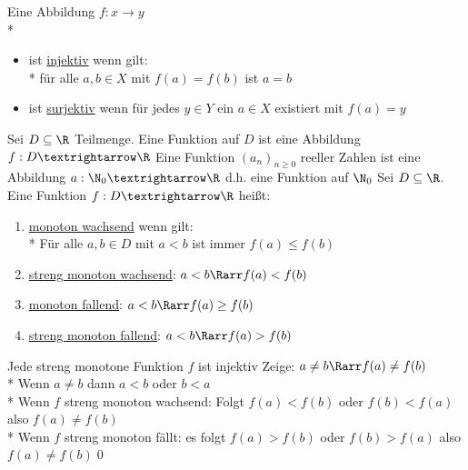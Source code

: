 %
\wdh
Eine Abbildung $f:x→y$\\*
\begin{itemize}
\item{ist \ul{injektiv} wenn gilt:\\*
für alle $a,b\in X$ mit $f(a)=f(b)$ ist $a=b$}
\item{ist \ul{surjektiv} wenn für jedes $y\in Y$ ein $a\in X$ existiert mit $f(a)=y$}
\end{itemize}
Sei $D\subseteq\R$ Teilmenge. Eine Funktion auf $D$ ist eine Abbildung $f:D→\R$
%
\bem
Eine Funktion $(a_n)_{n\geq 0}$ reeller Zahlen ist eine Abbildung $a:\N_0→\R$ d.h. eine Funktion auf $\N_0$
%
Sei $D\subseteq\R$. Eine Funktion  $f:D→\R$ heißt:
\begin{enumerate}
\item{\ul{monoton wachsend} wenn gilt:\\*
Für alle $a,b\in D$ mit $a<b$ ist immer $f(a)\leq f(b)$}
\item{\ul{streng monoton wachsend}: $a<b\Rarr f(a)<f(b)$}
\item{\ul{monoton fallend}: $a<b\Rarr f(a)\geq f(b)$}
\item{\ul{streng monoton fallend}: $a<b\Rarr f(a)> f(b)$}
\end{enumerate}
%
\bem
Jede streng monotone Funktion $f$ ist injektiv
%
\bew
Zeige: $a\neq b\Rarr f(a)\neq f(b)$\\*
Wenn $a\neq b$ dann $a< b$ oder $b<a$\\*
Wenn $f$ streng monoton wachsend: Folgt $f(a)< f(b)$ oder $f(b)< f(a)$ also $f(a)\neq f(b)$\\*
Wenn $f$ streng monoton fällt: es folgt $f(a)> f(b)$ oder $f(b)> f(a)$ also $f(a)\neq f(b)$\qed
%
